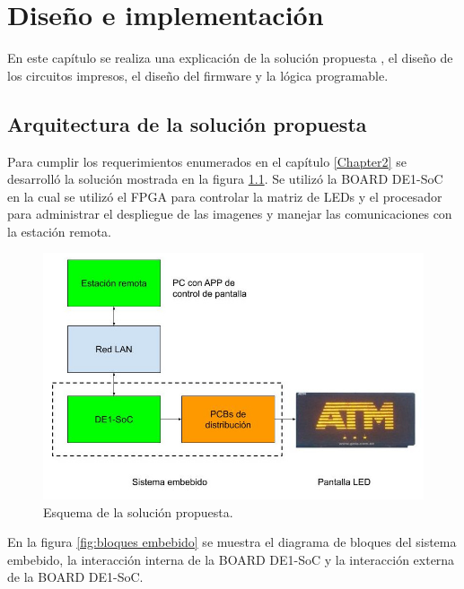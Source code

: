 \chapter{Diseño e implementación} %

\label{Chapter3} 
En este capítulo se realiza una explicación de la solución propuesta , el diseño de los circuitos impresos, el diseño del firmware y la lógica programable.

\section{ Arquitectura de la solución propuesta}
Para cumplir los requerimientos enumerados en el capítulo \ref{Chapter2} se desarrolló la solución mostrada en la figura \ref{fig:solución}. Se utilizó la BOARD DE1-SoC en la cual se utilizó el FPGA para controlar la matriz de LEDs y el procesador para administrar el despliegue de las imagenes y manejar las comunicaciones con la estación remota.
\begin{figure}[htpb]
	\centering
	\includegraphics[scale=2]{Figures/Diagramasistemavms.jpg} 
	\caption{Esquema de la solución propuesta.}
	\label{fig:solución}
\end{figure}

En la figura \ref{fig:bloques embebido} se muestra el diagrama de bloques del sistema embebido, la interacción interna de la BOARD DE1-SoC y la interacción externa de la BOARD DE1-SoC.
 
